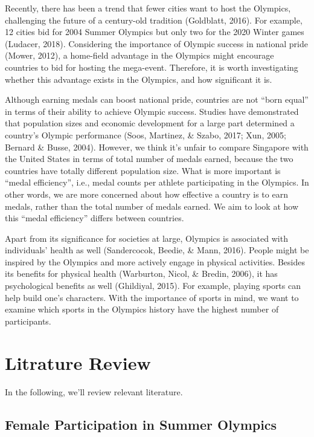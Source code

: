 \documentclass[
]{article}
\begin{document}
Recently, there has been a trend that fewer cities want to host the Olympics, challenging the future of a century-old tradition (Goldblatt, 2016). For example, 12 cities bid for 2004 Summer Olympics but only two for the 2020 Winter games (Ludacer, 2018). Considering the importance of Olympic success in national pride (Mower, 2012), a home-field advantage in the Olympics might encourage countries to bid for hosting the mega-event. Therefore, it is worth investigating whether this advantage exists in the Olympics, and how significant it is.

Although earning medals can boost national pride, countries are not ``born equal'' in terms of their ability to achieve Olympic success. Studies have demonstrated that population sizes and economic development for a large part determined a country's Olympic performance (Soos, Martinez, \& Szabo, 2017; Xun, 2005; Bernard \& Busse, 2004). However, we think it's unfair to compare Singapore with the United States in terms of total number of medals earned, because the two countries have totally different population size. What is more important is ``medal efficiency'', i.e., medal counts per athlete participating in the Olympics. In other words, we are more concerned about how effective a country is to earn medals, rather than the total number of medals earned. We aim to look at how this ``medal efficiency'' differs between countries.

Apart from its significance for societies at large, Olympics is associated with individuals' health as well (Sandercocok, Beedie, \& Mann, 2016). People might be inspired by the Olympics and more actively engage in physical activities. Besides its benefits for physical health (Warburton, Nicol, \& Bredin, 2006), it has psychological benefits as well (Ghildiyal, 2015). For example, playing sports can help build one's characters. With the importance of sports in mind, we want to examine which sports in the Olympics history have the highest number of participants.

\hypertarget{lit}{%
\section{Litrature Review}\label{lit}}

In the following, we'll review relevant literature.

\hypertarget{lit-female}{%
\subsection{Female Participation in Summer Olympics}\label{lit-female}}
\end{document}
